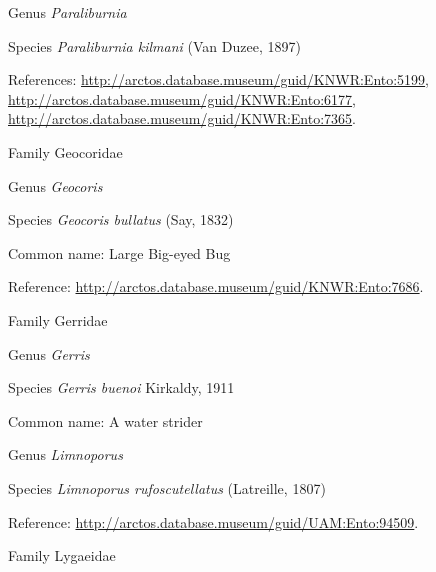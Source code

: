 \documentclass[9pt, article]{memoir}
\begin{document}
\begin{multicols}{2}
\vspace{6pt}\noindent\hspace{30pt}Genus \textit{Paraliburnia}


\vspace{6pt}\noindent\hspace{36pt}Species \textit{Paraliburnia kilmani} (Van Duzee, 1897)


References: 
\url{http://arctos.database.museum/guid/KNWR:Ento:5199}, 
\url{http://arctos.database.museum/guid/KNWR:Ento:6177}, 
\url{http://arctos.database.museum/guid/KNWR:Ento:7365}.

\vspace{6pt}\noindent\hspace{24pt}Family Geocoridae


\vspace{6pt}\noindent\hspace{30pt}Genus \textit{Geocoris}


\vspace{6pt}\noindent\hspace{36pt}Species \textit{Geocoris bullatus} (Say, 1832)


Common name: Large Big-eyed Bug

Reference: 
\url{http://arctos.database.museum/guid/KNWR:Ento:7686}.

\vspace{6pt}\noindent\hspace{24pt}Family Gerridae


\vspace{6pt}\noindent\hspace{30pt}Genus \textit{Gerris}


\vspace{6pt}\noindent\hspace{36pt}Species \textit{Gerris buenoi} Kirkaldy, 1911


Common name: A water strider

\vspace{6pt}\noindent\hspace{30pt}Genus \textit{Limnoporus}


\vspace{6pt}\noindent\hspace{36pt}Species \textit{Limnoporus rufoscutellatus} (Latreille, 1807)


Reference: 
\url{http://arctos.database.museum/guid/UAM:Ento:94509}.

\vspace{6pt}\noindent\hspace{24pt}Family Lygaeidae



\end{multicols}
\end{document}
